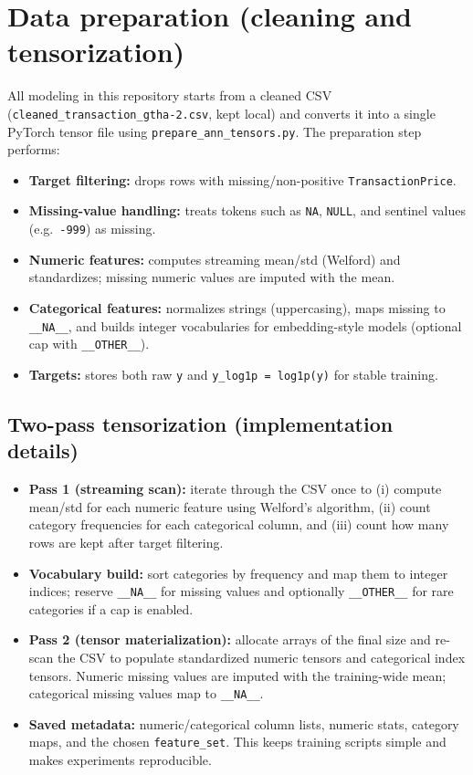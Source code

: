 \documentclass[11pt]{article}
\begin{document}
\section{Data preparation (cleaning and tensorization)}
All modeling in this repository starts from a cleaned CSV (\texttt{cleaned\_transaction\_gtha-2.csv}, kept local) and converts it into a single PyTorch tensor file using \texttt{prepare\_ann\_tensors.py}. The preparation step performs:
\begin{itemize}[leftmargin=*]
  \item \textbf{Target filtering:} drops rows with missing/non-positive \texttt{TransactionPrice}.
  \item \textbf{Missing-value handling:} treats tokens such as \texttt{NA}, \texttt{NULL}, and sentinel values (e.g.\ \texttt{-999}) as missing.
  \item \textbf{Numeric features:} computes streaming mean/std (Welford) and standardizes; missing numeric values are imputed with the mean.
  \item \textbf{Categorical features:} normalizes strings (uppercasing), maps missing to \texttt{\_\_NA\_\_}, and builds integer vocabularies for embedding-style models (optional cap with \texttt{\_\_OTHER\_\_}).
  \item \textbf{Targets:} stores both raw \texttt{y} and \texttt{y\_log1p = log1p(y)} for stable training.
\end{itemize}

\subsection{Two-pass tensorization (implementation details)}
\begin{itemize}[leftmargin=*]
  \item \textbf{Pass 1 (streaming scan):} iterate through the CSV once to (i) compute mean/std for each numeric feature using Welford’s algorithm, (ii) count category frequencies for each categorical column, and (iii) count how many rows are kept after target filtering.
  \item \textbf{Vocabulary build:} sort categories by frequency and map them to integer indices; reserve \texttt{\_\_NA\_\_} for missing values and optionally \texttt{\_\_OTHER\_\_} for rare categories if a cap is enabled.
  \item \textbf{Pass 2 (tensor materialization):} allocate arrays of the final size and re-scan the CSV to populate standardized numeric tensors and categorical index tensors. Numeric missing values are imputed with the training-wide mean; categorical missing values map to \texttt{\_\_NA\_\_}.
  \item \textbf{Saved metadata:} numeric/categorical column lists, numeric stats, category maps, and the chosen \texttt{feature\_set}. This keeps training scripts simple and makes experiments reproducible.
\end{itemize}
\end{document}
